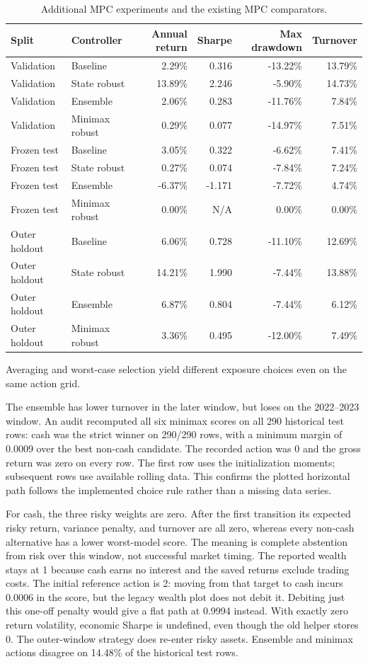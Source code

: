 \documentclass[11pt,a4paper]{article}
\begin{document}
\begin{table}[H]
\centering
\caption{Additional MPC experiments and the existing MPC comparators.}
\label{tab:extra-mpc}
\small
\begin{tabular}{@{}llrrrr@{}}
\toprule
Split & Controller & Annual return & Sharpe & Max drawdown & Turnover\\
\midrule
Validation & Baseline & 2.29\% & 0.316 & -13.22\% & 13.79\%\\
Validation & State robust & 13.89\% & 2.246 & -5.90\% & 14.73\%\\
Validation & Ensemble & 2.06\% & 0.283 & -11.76\% & 7.84\%\\
Validation & Minimax robust & 0.29\% & 0.077 & -14.97\% & 7.51\%\\
Frozen test & Baseline & 3.05\% & 0.322 & -6.62\% & 7.41\%\\
Frozen test & State robust & 0.27\% & 0.074 & -7.84\% & 7.24\%\\
Frozen test & Ensemble & -6.37\% & -1.171 & -7.72\% & 4.74\%\\
Frozen test & Minimax robust & 0.00\% & N/A & 0.00\% & 0.00\%\\
Outer holdout & Baseline & 6.06\% & 0.728 & -11.10\% & 12.69\%\\
Outer holdout & State robust & 14.21\% & 1.990 & -7.44\% & 13.88\%\\
Outer holdout & Ensemble & 6.87\% & 0.804 & -7.44\% & 6.12\%\\
Outer holdout & Minimax robust & 3.36\% & 0.495 & -12.00\% & 7.49\%\\
\bottomrule
\end{tabular}
\end{table}
Averaging and worst-case selection yield different exposure choices even on the same action grid.

The ensemble has lower turnover in the later window, but loses on the 2022--2023 window. An audit recomputed all six minimax scores on all 290 historical test rows: cash was the strict winner on 290/290 rows, with a minimum margin of 0.0009 over the best non-cash candidate. The recorded action was 0 and the gross return was zero on every row. The first row uses the initialization moments; subsequent rows use available rolling data. This confirms the plotted horizontal path follows the implemented choice rule rather than a missing data series.

For cash, the three risky weights are zero. After the first transition its expected risky return, variance penalty, and turnover are all zero, whereas every non-cash alternative has a lower worst-model score. The meaning is complete abstention from risk over this window, not successful market timing. The reported wealth stays at 1 because cash earns no interest and the saved returns exclude trading costs. The initial reference action is 2: moving from that target to cash incurs 0.0006 in the score, but the legacy wealth plot does not debit it. Debiting just this one-off penalty would give a flat path at 0.9994 instead. With exactly zero return volatility, economic Sharpe is undefined, even though the old helper stores 0. The outer-window strategy does re-enter risky assets. Ensemble and minimax actions disagree on 14.48\% of the historical test rows.
\end{document}
